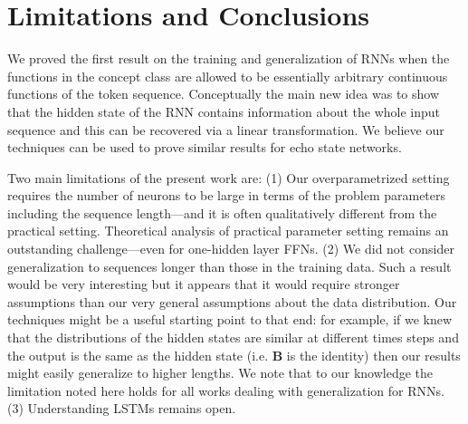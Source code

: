 \section{Limitations and Conclusions} \label{sec:conclusion}

We proved the first result on the training and generalization of RNNs when the functions in the concept class are allowed to be essentially arbitrary continuous functions of the token sequence. Conceptually the main new idea was to show that the hidden state of the RNN contains information about the whole input sequence and this can be recovered via a linear transformation. We believe our techniques can be used to prove similar results for echo state networks.  

Two main limitations of the present work are: (1) Our overparametrized setting requires the number of neurons to be large in terms of the problem parameters including the sequence length---and it is often qualitatively different from the practical setting. Theoretical analysis of practical parameter setting remains an outstanding challenge---even for one-hidden layer FFNs. 
(2) We did not consider generalization to sequences longer than those in the training data. Such a result would be very interesting but it appears that it would require stronger assumptions than our very general assumptions about the data distribution. Our techniques might be a useful starting point to that end: for example, if we knew that the distributions of the hidden states are similar at different times steps and the output is the same as the hidden state (i.e. $\mathbf{B}$ is the identity) then our results might easily generalize to higher lengths. We note that to our knowledge the limitation noted here holds for all works dealing with generalization for RNNs.
(3) Understanding LSTMs remains open.




